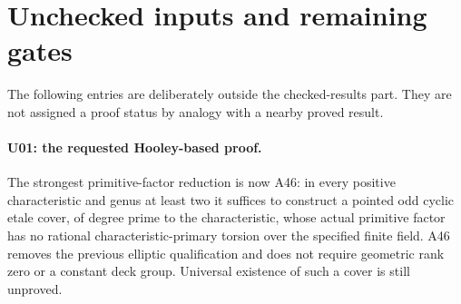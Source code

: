 \documentclass[11pt,a4paper]{article}
\begin{document}
\section{Unchecked inputs and remaining gates}
\label{sec:remaining}

The following entries are deliberately outside the checked-results
part. They are not assigned a proof status by analogy with a nearby
proved result.

\paragraph{U01: the requested Hooley-based proof.}
The strongest primitive-factor reduction is now A46: in every positive
characteristic and genus at least two it suffices to construct a pointed
odd cyclic etale cover, of degree prime to the characteristic, whose
actual primitive factor has no rational characteristic-primary torsion
over the specified finite field. A46 removes the previous elliptic
qualification and does not require geometric rank zero or a constant
deck group. Universal existence of such a cover is still unproved.
\end{document}
